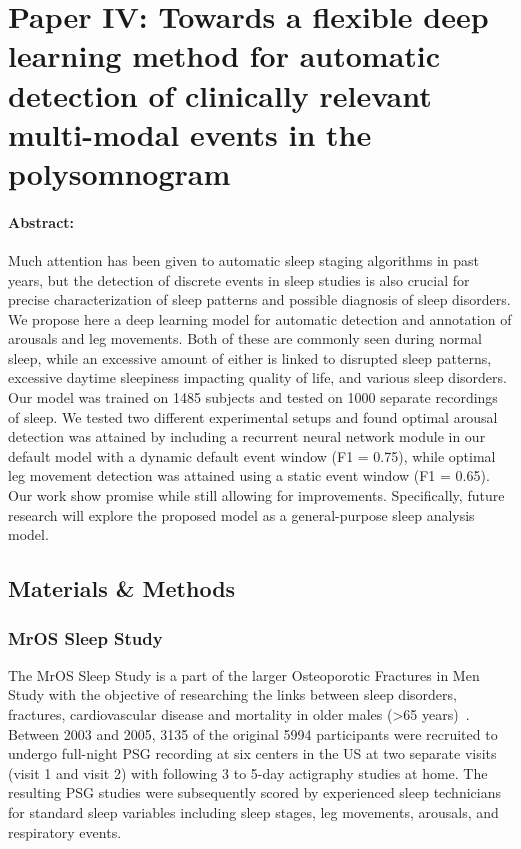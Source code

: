 \section{Paper IV: Towards a flexible deep learning method for automatic detection of clinically relevant multi-modal events in the polysomnogram}\label{sec:paperiv}

\begin{tcolorbox}[colframe=white]
\paragraph{Abstract: } 
Much attention has been given to automatic sleep staging algorithms in past years, but the detection of discrete events in sleep studies is also crucial for precise characterization of sleep patterns and possible diagnosis of sleep disorders. 
We propose here a deep learning model for automatic detection and annotation of arousals and leg movements. 
Both of these are commonly seen during normal sleep, while an excessive amount of either is linked to disrupted sleep patterns, excessive daytime sleepiness impacting quality of life, and various sleep disorders. 
Our model was trained on 1485 subjects and tested on 1000 separate recordings of sleep. 
We tested two different experimental setups and found optimal arousal detection was attained by including a recurrent neural network module in our default model with a dynamic default event window (F1 = 0.75), while optimal leg movement detection was attained using a static event window (F1 = 0.65). 
Our work show promise while still allowing for improvements. 
Specifically, future research will explore the proposed model as a general-purpose sleep analysis model.
\end{tcolorbox}

\subsection{Materials \& Methods}

\subsubsection{MrOS Sleep Study}
The MrOS Sleep Study is a part of the larger Osteoporotic Fractures in Men Study with the objective of researching the links between sleep disorders, fractures, cardiovascular disease and mortality in older males (\num{>65} years)~\cite{Blank2005,Orwoll2005,Blackwell2011}. 
Between 2003 and 2005, 3135 of the original 5994 participants were recruited to undergo full-night \ac{PSG} recording at six centers in the US at two separate visits (visit 1 and visit 2) with following 3 to 5-day actigraphy studies at home. 
The resulting \ac{PSG} studies were subsequently scored by experienced sleep technicians for standard sleep variables including sleep stages, leg movements, arousals, and respiratory events.


